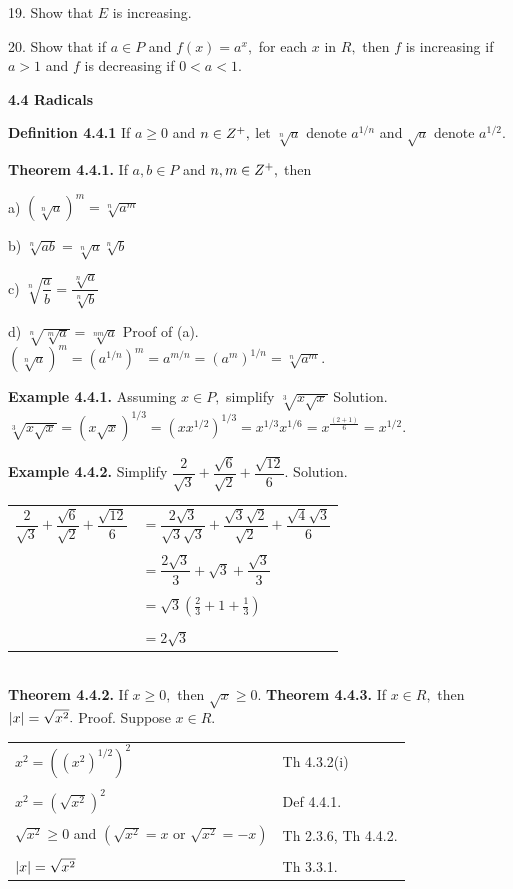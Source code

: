 19. Show that $E$ is increasing. \nl

20. Show that if $a\in P$ and $f(x) = a^{x},$ for each $x$ in $R,$ then $f$ is increasing if $a > 1$ and $f$ is decreasing if $0 < a < 1.$\nl

\vfill

\textbf{4.4 Radicals}\nl

\textbf{Definition 4.4.1}   If $a \geq 0$ and $n \in Z^{+},$ let $\sqrt[n]{a}$ denote $a^{1/n}$ and $\sqrt{a}$ denote $a^{1/2}.$\nl

\textbf{Theorem 4.4.1.}  If $a,b\in P$ and $n,m\in Z^{+},$ then\nl

a) $(\sqrt[n]{a})^{m} = \sqrt[n]{a^{m}}$\nl

b) $\sqrt[n]{ab} = \sqrt[n]{a}\sqrt[n]{b}$\nl

c) $\sqrt[n]{\dfrac{a}{b}} = \dfrac{\sqrt[n]{a}}{\sqrt[n]{b}}$\nl

\newpage

d)  $\sqrt[n]{\sqrt[m]{a}} = \sqrt[nm]{a}$\nl
Proof of (a).  $(\sqrt[n]{a})^{m} = (a^{1/n})^{m}  = a^{m/n} = (a^{m})^{1/n} = \sqrt[n]{a^{m}}. $\nl

\textbf{Example 4.4.1.}  Assuming $x\in P,$ simplify $\sqrt[3]{x\sqrt{x}}$\nl
Solution.\nl
$\sqrt[3]{x\sqrt{x}} = (x\sqrt{x})^{1/3} = (xx^{1/2})^{1/3} = x^{1/3}x^{1/6} = x^{\frac{(2+1)}{6}} = x^{1/2}.$\nl

\textbf{Example 4.4.2.} Simplify $\dfrac{2}{\sqrt{3}} + \dfrac{\sqrt{6}}{\sqrt{2}} + \dfrac{\sqrt{12}}{6}.$\nl
Solution.\nl
\begin{tabular}{r l}
$\dfrac{2}{\sqrt{3}} + \dfrac{\sqrt{6}}{\sqrt{2}} + \dfrac{\sqrt{12}}{6}$&$=\dfrac{2\sqrt{3}}{\sqrt{3}\sqrt{3}} +
\dfrac{\sqrt{3}\sqrt{2}}{\sqrt{2}} + \dfrac{\sqrt{4}\sqrt{3}}{6}$ \\
&\\
&$=\dfrac{2\sqrt{3}}{3} + \sqrt{3} + \dfrac{\sqrt{3}}{3}$\\
&\\
&$=\sqrt{3}\left(\frac{2}{3} + 1 +\frac{1}{3}\right)$\\
&\\
&$=2\sqrt{3}$\\
\end{tabular}\\
\textbf{Theorem 4.4.2.} If $x \geq 0,$ then $\sqrt{x} \geq 0.$\nl
\textbf{Theorem 4.4.3.}  If $x \in R,$ then $\left|x\right| = \sqrt{x^{2}}.$\nl
Proof.  Suppose $x \in R$.\nl

\begin{tabular}{l l}
$x^{2} = ((x^{2})^{1/2})^{2}$& Th 4.3.2(i)\\
&\\
$x^{2} = (\sqrt{x^{2}})^{2}$&Def 4.4.1.\\
&\\
$\sqrt{x^{2}} \geq 0$ and $(\sqrt{x^{2}} = x \text{~or~} \sqrt{x^{2}} = -x)$&Th 2.3.6, Th 4.4.2.\\
&\\
$\left|x\right| = \sqrt{x^{2}}$&Th 3.3.1.\\
\end{tabular}\\

